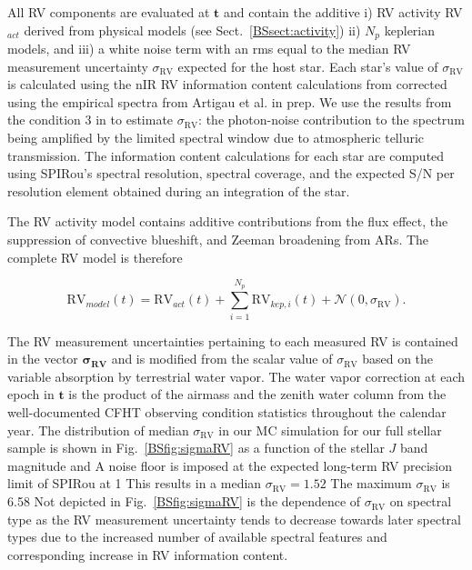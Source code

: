 All RV components are evaluated at $\mathbf{t}$ and contain the additive i) RV activity RV$_{act}$ derived from 
physical models (see Sect.~\ref{BSsect:activity}) ii) $N_p$ keplerian models, and iii) a white noise term with an rms equal
to the median RV measurement uncertainty $\sigma_{\text{RV}}$ expected for the host star. Each star's value of
$\sigma_{\text{RV}}$ is calculated using the nIR RV
information content calculations from \cite{figueira16} corrected using the empirical spectra from Artigau et al. in prep.
We use the results from the condition 3 in \cite{figueira16} to estimate $\sigma_{\text{RV}}$:
the photon-noise contribution to the spectrum
being amplified by the limited spectral window due to atmospheric telluric transmission.
The information content calculations for each star are computed using SPIRou's spectral resolution,
spectral coverage, and the expected S/N per resolution element obtained during an integration of the star.

The RV activity model contains additive contributions from the flux effect, the suppression of convective blueshift,
and Zeeman broadening from ARs. The complete RV model is therefore

\begin{equation}
  \text{RV}_{model}(t) = \text{RV}_{act}(t) + \sum_{i=1}^{N_p} \text{RV}_{kep,i}(t) + \mathcal{N}(0,\sigma_{\text{RV}}).
\end{equation}

\noindent The RV measurement uncertainties pertaining to each measured RV is contained in the vector
$\boldsymbol{\sigma_{\text{RV}}}$ and is modified from the scalar value of $\sigma_{\text{RV}}$
based on the variable absorption by terrestrial
water vapor. The water vapor correction at each epoch in $\mathbf{t}$ is the product of the airmass and the zenith
water column from the well-documented CFHT observing condition statistics throughout the calendar year. 
The distribution of median $\sigma_{\text{RV}}$ in our MC simulation for our full
stellar sample is shown in Fig.~\ref{BSfig:sigmaRV} as a function
of the stellar $J$ band magnitude and  A noise floor is imposed at the expected long-term RV precision limit
of SPIRou at 1  This results in a median
$\sigma_{\text{RV}}=1.52$  The maximum $\sigma_{\text{RV}}$ is 6.58  
Not depicted in Fig.~\ref{BSfig:sigmaRV} is the dependence of
$\sigma_{\text{RV}}$ on spectral type as the RV measurement uncertainty tends to decrease towards later spectral types
due to the increased number of available spectral features and corresponding increase in RV information content.

